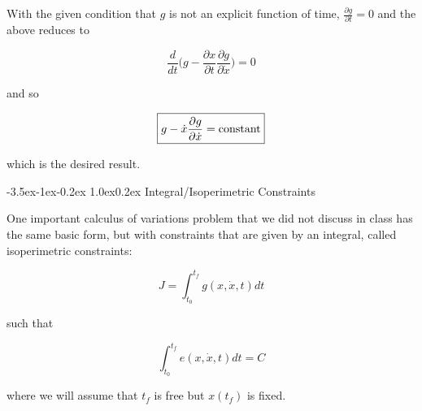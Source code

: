 \documentclass[11pt,letterpaper,onecolumn,notitlepage]{article}
\makeatletter
\renewcommand\section{\@startsection{section}{1}{\z@}%
{-3.5ex\@plus-1ex\@minus-0.2ex}%
{1.0ex\@plus0.2ex}%
{\fontsize{12pt}{12pt}\selectfont\bfseries\sffamily}}
\makeatother
\begin{document}
With the given condition that $g$ is not an explicit function of time, $\frac{\partial{}g}{\partial{}t}=0$ and the above reduces to

\begin{equation*}
  \frac{d}{dt}\biggr(g-\frac{\partial{}x}{\partial{}t}\frac{\partial{}g}{\partial\dot{x}}\biggr)=0
\end{equation*}

and so

\begin{equation*}
  \boxed{%
    g-\dot{x}\frac{\partial{}g}{\partial\dot{x}}=\text{constant}
  }
\end{equation*}

which is the desired result.


\clearpage
\section{Integral/Isoperimetric Constraints}

One important calculus of variations problem that we did not discuss in class has the same basic form, but with constraints that are given by an integral, called isoperimetric constraints:

\begin{equation*}
  J=\int_{t_{0}}^{t_{f}}g(x,\dot{x},t)dt
\end{equation*}

such that

\begin{equation*}
  \int_{t_{0}}^{t_{f}}e(x,\dot{x},t)dt=C
\end{equation*}

where we will assume that $t_{f}$ is free but $x(t_{f})$ is fixed.
\end{document}
